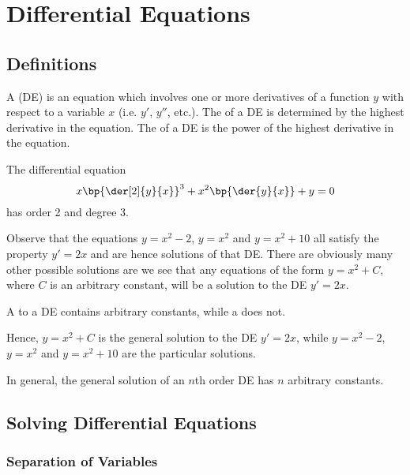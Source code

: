 \chapter{Differential Equations}

\section{Definitions}

\begin{definition}
    A  (DE) is an equation which involves one or more derivatives of a function $y$ with respect to a variable $x$ (i.e. $y'$, $y''$, etc.). The  of a DE is determined by the highest derivative in the equation. The  of a DE is the power of the highest derivative in the equation.
\end{definition}

\begin{example}
    The differential equation \[x \bp{\der[2]{y}{x}}^3 + x^2 \bp{\der{y}{x}} + y = 0\] has order 2 and degree 3.
\end{example}

Observe that the equations $y = x^2 - 2$, $y = x^2$ and $y = x^2 + 10$ all satisfy the property $y' = 2x$ and are hence solutions of that DE. There are obviously many other possible solutions are we see that any equations of the form $y = x^2 + C$, where $C$ is an arbitrary constant, will be a solution to the DE $y' = 2x$.

\begin{definition}
    A  to a DE contains arbitrary constants, while a  does not.
\end{definition}

Hence, $y = x^2 + C$ is the general solution to the DE $y' = 2x$, while $y = x^2 - 2$, $y = x^2$ and $y = x^2 + 10$ are the particular solutions.

In general, the general solution of an $n$th order DE has $n$ arbitrary constants.

\section{Solving Differential Equations}

\subsection{Separation of Variables}

